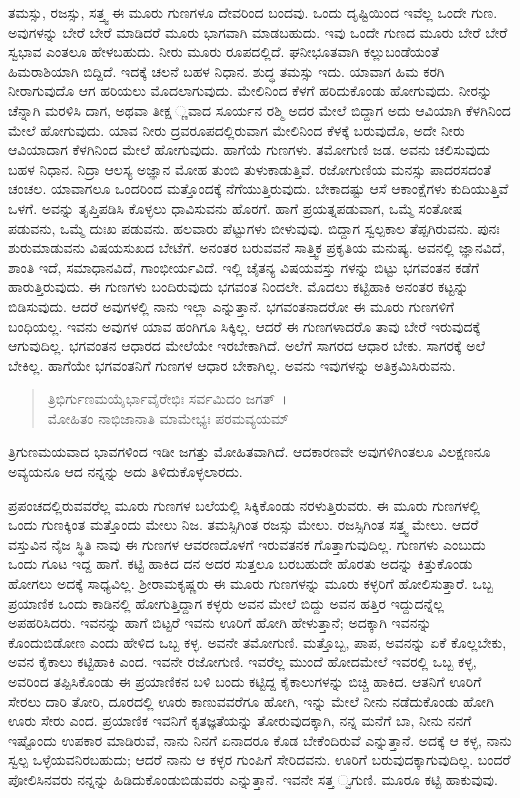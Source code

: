 ತಮಸ್ಸು, ರಜಸ್ಸು, ಸತ್ತ್ವ ಈ ಮೂರು ಗುಣಗಳೂ ದೇವರಿಂದ ಬಂದವು. ಒಂದು ದೃಷ್ಟಿಯಿಂದ ಇವೆಲ್ಲ ಒಂದೇ ಗುಣ. ಅವುಗಳನ್ನು ಬೇರೆ ಬೇರೆ ಮಾಡಿದರೆ ಮೂರು ಭಾಗವಾಗಿ ಮಾಡಬಹುದು. ಇವು ಒಂದೇ ಗುಣದ ಮೂರು ಬೇರೆ ಬೇರೆ ಸ್ವಭಾವ ಎಂತಲೂ ಹೇಳಬಹುದು. ನೀರು ಮೂರು ರೂಪದಲ್ಲಿದೆ. ಘನೀಭೂತವಾಗಿ ಕಲ್ಲುಬಂಡೆಯಂತೆ ಹಿಮರಾಶಿಯಾಗಿ ಬಿದ್ದಿದೆ. ಇದಕ್ಕೆ ಚಲನೆ ಬಹಳ ನಿಧಾನ. ಶುದ್ಧ ತಮಸ್ಸು ಇದು. ಯಾವಾಗ ಹಿಮ ಕರಗಿ ನೀರಾಗುವುದೊ ಆಗ ಹರಿಯಲು ಮೊದಲಾಗುವುದು. ಮೇಲಿನಿಂದ ಕೆಳಗೆ ಹರಿದುಕೊಂಡು ಹೋಗುವುದು. ನೀರನ್ನು ಚೆನ್ನಾಗಿ ಮರಳಿಸಿ ದಾಗ, ಅಥವಾ ತೀಕ್ಷ ್ಣವಾದ ಸೂರ್ಯನ ರಶ್ಮಿ ಅದರ ಮೇಲೆ ಬಿದ್ದಾಗ ಅದು ಆವಿಯಾಗಿ ಕೆಳಗಿನಿಂದ ಮೇಲೆ ಹೋಗುವುದು. ಯಾವ ನೀರು ದ್ರವರೂಪದಲ್ಲಿರುವಾಗ ಮೇಲಿನಿಂದ ಕೆಳಕ್ಕೆ ಬರುವುದೊ, ಅದೇ ನೀರು ಆವಿಯಾದಾಗ ಕೆಳಗಿನಿಂದ ಮೇಲೆ ಹೋಗುವುದು. ಹಾಗೆಯೆ ಗುಣಗಳು. ತಮೋಗುಣಿ ಜಡ. ಅವನು ಚಲಿಸುವುದು ಬಹಳ ನಿಧಾನ. ನಿದ್ರಾ ಆಲಸ್ಯ ಅಜ್ಞಾನ ಮೋಹ ತುಂಬಿ ತುಳುಕಾಡುತ್ತಿವೆ. ರಜೋಗುಣಿಯ ಮನಸ್ಸು ಪಾದರಸದಂತೆ ಚಂಚಲ. ಯಾವಾಗಲೂ ಒಂದರಿಂದ ಮತ್ತೊಂದಕ್ಕೆ ನೆಗೆಯುತ್ತಿರುವುದು. ಬೇಕಾದಷ್ಟು ಆಸೆ ಆಕಾಂಕ್ಷೆಗಳು ಕುದಿಯುತ್ತಿವೆ ಒಳಗೆ. ಅವನ್ನು ತೃಪ್ತಿಪಡಿಸಿ ಕೊಳ್ಳಲು ಧಾವಿಸುವನು ಹೊರಗೆ. ಹಾಗೆ ಪ್ರಯತ್ನಪಡುವಾಗ, ಒಮ್ಮೆ ಸಂತೋಷ ಪಡುವನು, ಒಮ್ಮೆ ದುಃಖ ಪಡುವನು. ಹಲವಾರು ಪೆಟ್ಟುಗಳು ಬೀಳುವುವು. ಬಿದ್ದಾಗ ಸ್ವಲ್ಪಕಾಲ ತೆಪ್ಪಗಿರುವನು. ಪುನಃ ಶುರುಮಾಡುವನು ವಿಷಯಸುಖದ ಬೇಟೆಗೆ. ಅನಂತರ ಬರುವವನೆ ಸಾತ್ತ್ವಿಕ ಪ್ರಕೃತಿಯ ಮನುಷ್ಯ. ಅವನಲ್ಲಿ ಜ್ಞಾನವಿದೆ, ಶಾಂತಿ ಇದೆ, ಸಮಾಧಾನವಿದೆ, ಗಾಂಭೀರ್ಯವಿದೆ. ಇಲ್ಲಿ ಚೈತನ್ಯ ವಿಷಯವಸ್ತು ಗಳನ್ನು ಬಿಟ್ಟು ಭಗವಂತನ ಕಡೆಗೆ ಹಾರುತ್ತಿರುವುದು. ಈ ಗುಣಗಳು ಬಂದಿರುವುದು ಭಗವಂತ ನಿಂದಲೇ. ಮೊದಲು ಕಟ್ಟಿಹಾಕಿ ಅನಂತರ ಕಟ್ಟನ್ನು ಬಿಡಿಸುವುದು. ಆದರೆ ಅವುಗಳಲ್ಲಿ ನಾನು ಇಲ್ಲಾ ಎನ್ನುತ್ತಾನೆ. ಭಗವಂತನಾದರೋ ಈ ಮೂರು ಗುಣಗಳಿಗೆ ಬಂಧಿಯಲ್ಲ. ಇವನು ಅವುಗಳ ಯಾವ ಹಂಗಿಗೂ ಸಿಕ್ಕಿಲ್ಲ. ಆದರೆ ಈ ಗುಣಗಳಾದರೊ ತಾವು ಬೇರೆ ಇರುವುದಕ್ಕೆ ಆಗುವುದಿಲ್ಲ. ಭಗವಂತನ ಆಧಾರದ ಮೇಲೆಯೇ ಇರಬೇಕಾಗಿದೆ. ಅಲೆಗೆ ಸಾಗರದ ಆಧಾರ ಬೇಕು. ಸಾಗರಕ್ಕೆ ಅಲೆ ಬೇಕಿಲ್ಲ. ಹಾಗೆಯೇ ಭಗವಂತನಿಗೆ ಗುಣಗಳ ಆಧಾರ ಬೇಕಾಗಿಲ್ಲ. ಅವನು ಇವುಗಳನ್ನು ಅತಿಕ್ರಮಿಸಿರುವನು.

\begin{verse}
 ತ್ರಿಭಿರ್ಗುಣಮಯೈರ್ಭಾವೈರೇಭಿಃ ಸರ್ವಮಿದಂ ಜಗತ್~।\\ಮೋಹಿತಂ ನಾಭಿಜಾನಾತಿ ಮಾಮೇಭ್ಯಃ ಪರಮವ್ಯಯಮ್ 
\end{verse}

{\small ತ್ರಿಗುಣಮಯವಾದ ಭಾವಗಳಿಂದ ಇಡೀ ಜಗತ್ತು ಮೋಹಿತವಾಗಿದೆ. ಆದಕಾರಣವೇ ಅವುಗಳಿಗಿಂತಲೂ ವಿಲಕ್ಷಣನೂ ಅವ್ಯಯನೂ ಆದ ನನ್ನನ್ನು ಅದು ತಿಳಿದುಕೊಳ್ಳಲಾರದು.}

ಪ್ರಪಂಚದಲ್ಲಿರುವವರೆಲ್ಲ ಮೂರು ಗುಣಗಳ ಬಲೆಯಲ್ಲಿ ಸಿಕ್ಕಿಕೊಂಡು ನರಳುತ್ತಿರುವರು. ಈ ಮೂರು ಗುಣಗಳಲ್ಲಿ ಒಂದು ಗುಣಕ್ಕಿಂತ ಮತ್ತೊಂದು ಮೇಲು ನಿಜ. ತಮಸ್ಸಿಗಿಂತ ರಜಸ್ಸು ಮೇಲು. ರಜಸ್ಸಿಗಿಂತ ಸತ್ತ್ವ ಮೇಲು. ಆದರೆ ವಸ್ತುವಿನ ನೈಜ ಸ್ಥಿತಿ ನಾವು ಈ ಗುಣಗಳ ಆವರಣದೊಳಗೆ ಇರುವತನಕ ಗೊತ್ತಾಗುವುದಿಲ್ಲ. ಗುಣಗಳು ಎಂಬುದು ಒಂದು ಗೂಟ ಇದ್ದ ಹಾಗೆ. ಕಟ್ಟಿ ಹಾಕಿದ ದನ ಅದರ ಸುತ್ತಲೂ ಬರಬಹುದೇ ಹೊರತು ಅದನ್ನು ಕಿತ್ತುಕೊಂಡು ಹೋಗಲು ಅದಕ್ಕೆ ಸಾಧ್ಯವಿಲ್ಲ. ಶ‍್ರೀರಾಮಕೃಷ್ಣರು ಈ ಮೂರು ಗುಣಗಳನ್ನು ಮೂರು ಕಳ್ಳರಿಗೆ ಹೋಲಿಸುತ್ತಾರೆ. ಒಬ್ಬ ಪ್ರಯಾಣಿಕ ಒಂದು ಕಾಡಿನಲ್ಲಿ ಹೋಗುತ್ತಿದ್ದಾಗ ಕಳ್ಳರು ಅವನ ಮೇಲೆ ಬಿದ್ದು ಅವನ ಹತ್ತಿರ ಇದ್ದುದನ್ನೆಲ್ಲ ಅಪಹರಿಸಿದರು. ಇವನನ್ನು ಹಾಗೆ ಬಿಟ್ಟರೆ ಇವನು ಊರಿಗೆ ಹೋಗಿ ಹೇಳುತ್ತಾನೆ; ಅದಕ್ಕಾಗಿ ಇವನನ್ನು ಕೊಂದುಬಿಡೋಣ ಎಂದು ಹೇಳಿದ ಒಬ್ಬ ಕಳ್ಳ. ಅವನೇ ತಮೋಗುಣಿ. ಮತ್ತೊಬ್ಬ, ಪಾಪ, ಅವನನ್ನು ಏಕೆ ಕೊಲ್ಲಬೇಕು, ಅವನ ಕೈಕಾಲು ಕಟ್ಟಿಹಾಕಿ ಎಂದ. ಇವನೇ ರಜೋಗುಣಿ. ಇವರೆಲ್ಲ ಮುಂದೆ ಹೋದಮೇಲೆ ಇವರಲ್ಲಿ ಒಬ್ಬ ಕಳ್ಳ, ಅವರಿಂದ ತಪ್ಪಿಸಿಕೊಂಡು ಈ ಪ್ರಯಾಣಿಕನ ಬಳಿ ಬಂದು ಕಟ್ಟಿದ್ದ ಕೈಕಾಲುಗಳನ್ನು ಬಿಚ್ಚಿ ಹಾಕಿದ. ಆತನಿಗೆ ಊರಿಗೆ ಸೇರಲು ದಾರಿ ತೋರಿ, ದೂರದಲ್ಲಿ ಊರು ಕಾಣುವವರೆಗೂ ಹೋಗಿ, ಇನ್ನು ಮೇಲೆ ನೀನು ನಡೆದುಕೊಂಡು ಹೋಗಿ ಊರು ಸೇರು ಎಂದ. ಪ್ರಯಾಣಿಕ ಇವನಿಗೆ ಕೃತಜ್ಞತೆಯನ್ನು ತೋರುವುದಕ್ಕಾಗಿ, ನನ್ನ ಮನೆಗೆ ಬಾ, ನೀನು ನನಗೆ ಇಷ್ಟೊಂದು ಉಪಕಾರ ಮಾಡಿರುವೆ, ನಾನು ನಿನಗೆ ಏನಾದರೂ ಕೊಡ ಬೇಕೆಂದಿರುವೆ ಎನ್ನುತ್ತಾನೆ. ಅದಕ್ಕೆ ಆ ಕಳ್ಳ, ನಾನು ಸ್ವಲ್ಪ ಒಳ್ಳೆಯವನಿರಬಹುದು; ಆದರೆ ನಾನು ಆ ಕಳ್ಳರ ಗುಂಪಿಗೆ ಸೇರಿದವನು. ಊರಿಗೆ ಬರುವುದಕ್ಕಾಗುವುದಿಲ್ಲ. ಬಂದರೆ ಪೋಲಿಸಿನವರು ನನ್ನನ್ನು ಹಿಡಿದುಕೊಂಡುಬಿಡುವರು ಎನ್ನುತ್ತಾನೆ. ಇವನೇ ಸತ್ತ ್ವಗುಣಿ. ಮೂರೂ ಕಟ್ಟಿ ಹಾಕುವುವು.

